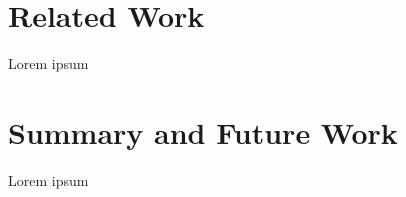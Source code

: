 \documentclass[sigplan,11pt,nonacm]{acmart}
\begin{document}


\section{Related Work}
\label{sec:relatedwork}
Lorem ipsum




\section{Summary and Future Work}
\label{sec:summary}
Lorem ipsum




\end{document}
